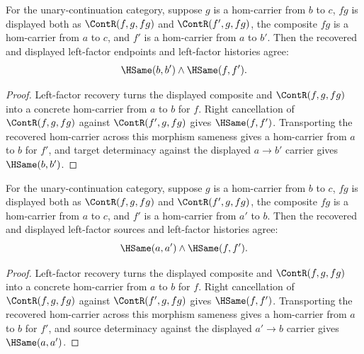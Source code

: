 \begin{theorem}
\label{thm:category-comp-left-factor-endpoint-deterministic}
For the unary-continuation category, suppose $g$ is a hom-carrier from $b$ to
$c$, $fg$ is displayed both as $\ContR(f,g,fg)$ and $\ContR(f',g,fg)$, the
composite $fg$ is a hom-carrier from $a$ to $c$, and $f'$ is a hom-carrier
from $a$ to $b'$. Then the recovered and displayed left-factor endpoints and
left-factor histories agree:
$$
\HSame(b,b')\wedge\HSame(f,f').
$$
\end{theorem}
\begin{proof}
Left-factor recovery turns the displayed composite and $\ContR(f,g,fg)$ into
a concrete hom-carrier from $a$ to $b$ for $f$. Right cancellation of
$\ContR(f,g,fg)$ against $\ContR(f',g,fg)$ gives $\HSame(f,f')$. Transporting
the recovered hom-carrier across this morphism sameness gives a hom-carrier
from $a$ to $b$ for $f'$, and target determinacy against the displayed
$a\to b'$ carrier gives $\HSame(b,b')$.
\end{proof}

\begin{theorem}
\label{thm:category-hom-carrier-comp-left-factor-source-deterministic}
For the unary-continuation category, suppose $g$ is a hom-carrier from $b$ to
$c$, $fg$ is displayed both as $\ContR(f,g,fg)$ and $\ContR(f',g,fg)$, the
composite $fg$ is a hom-carrier from $a$ to $c$, and $f'$ is a hom-carrier
from $a'$ to $b$. Then the recovered and displayed left-factor sources and
left-factor histories agree:
$$
\HSame(a,a')\wedge\HSame(f,f').
$$
\end{theorem}
\begin{proof}
Left-factor recovery turns the displayed composite and $\ContR(f,g,fg)$ into
a concrete hom-carrier from $a$ to $b$ for $f$. Right cancellation of
$\ContR(f,g,fg)$ against $\ContR(f',g,fg)$ gives $\HSame(f,f')$. Transporting
the recovered hom-carrier across this morphism sameness gives a hom-carrier
from $a$ to $b$ for $f'$, and source determinacy against the displayed
$a'\to b$ carrier gives $\HSame(a,a')$.
\end{proof}

